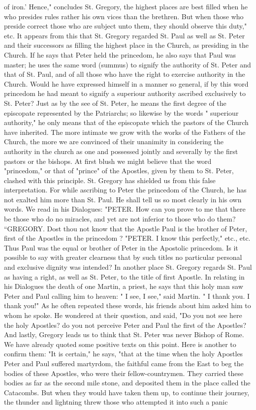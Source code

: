 of iron.' Hence," concludes St. Gregory, the highest places are best filled when he who presides rules rather his own vices than the brethren. But when those who preside correct those who are subject unto them, they should observe this duty," etc. It appears from this that St. Gregory regarded St. Paul as well as St. Peter and their successors as filling the highest place in the Church, as presiding in the Church. If he says that Peter held the princedom, he also says that Paul was master; he uses the same word (summus) to signify the authority of St. Peter and that of St. Paul, and of all those who have the right to exercise authority in the Church. Would he have expressed himself in a manner so general, if by this word princedom he had meant to signify a superiour authority ascribed exclusively to St. Peter? Just as by the see of St. Peter, he means the first degree of the episcopate represented by the Patriarchs; so likewise by the words " superiour authority," he only means that of the episcopate which the pastors of the Church have inherited. The more intimate we grow with the works of the Fathers of the Church, the more we are convinced of their unanimity in considering the authority in the church as one and possessed jointly and severally by the first pastors or the bishops. At first blush we might believe that the word "princedom," or that of "prince" of the Apostles, given by them to St. Peter, clashed with this principle. St. Gregory has shielded us from this false interpretation. For while ascribing to Peter the princedom of the Church, he has not exalted him more than St. Paul. He shall tell us so most clearly in his own words. We read in his Dialogues: "PETER. How can you prove to me that there be those who do no miracles, and yet are not inferior to those who do them? “GREGORY. Dost thou not know that the Apostle Paul is the brother of Peter, first of the Apostles in the princedom ? "PETER. I know this perfectly," etc., etc. Thus Paul was the equal or brother of Peter in the Apostolic princedom. Is it possible to say with greater clearness that by such titles no particular personal and exclusive dignity was intended? In another place St. Gregory regards St. Paul as having a right, as well as St. Peter, to the title of first Apostle. In relating in his Dialogues the death of one Martin, a priest, he says that this holy man saw Peter and Paul calling him to heaven: " I see, I see," said Martin. " I thank you. I thank you!" As he often repeated these words, his friends about him asked him to whom he spoke. He wondered at their question, and said, "Do you not see here the holy Apostles? do you not perceive Peter and Paul the first of the Apostles? And lastly, Gregory leads us to think that St. Peter was never Bishop of Rome. We have already quoted some positive texts on this point. Here is another to confirm them: "It is certain," he says, "that at the time when the holy Apostles Peter and Paul suffered martyrdom, the faithful came from the East to beg the bodies of these Apostles, who were their fellow-countrymen. They carried these bodies as far as the second mile stone, and deposited them in the place called the Catacombs. But when they would have taken them up, to continue their journey, the thunder and lightning threw those who attempted it into such a panic 